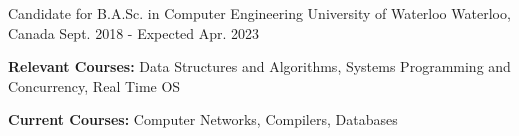 

\begin{cventries}

  \cventry
    {Candidate for B.A.Sc. in Computer Engineering} %
    {University of Waterloo} %
    {Waterloo, Canada} %
    {Sept. 2018 - Expected Apr. 2023} %
    {
      \begin{cvitems} %
        \item {\textbf{Relevant Courses:} Data Structures and Algorithms, Systems Programming and Concurrency, Real Time OS}
        \item {\textbf{Current Courses:} Computer Networks, Compilers, Databases}
      \end{cvitems}
    }

\end{cventries}
